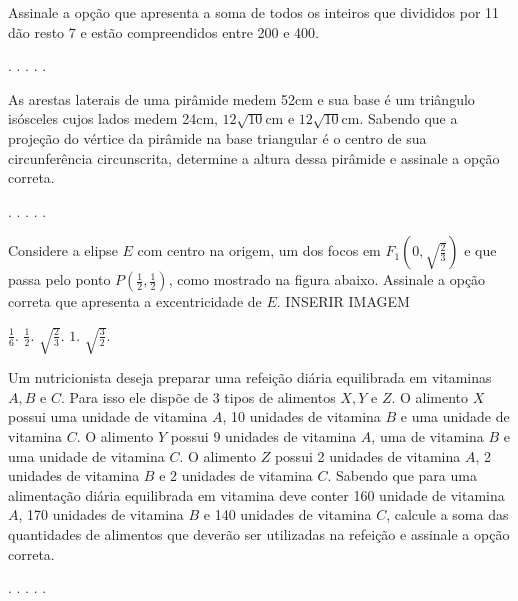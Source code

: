 \begin{question}%
Assinale a opção que apresenta a soma de todos os inteiros que divididos por 11 dão resto 7 e estão compreendidos entre 200 e 400.
    \begin{tasks}
        .
        .
        .
        .
        .
    \end{tasks}
\end{question}

\begin{question}%
As arestas laterais de uma pirâmide medem 52cm e sua base é um triângulo isósceles cujos lados medem 24cm, \(12\sqrt{10}\)cm e \(12\sqrt{10}\)cm. Sabendo que a projeção do vértice da pirâmide na base triangular é o centro de sua circunferência circunscrita, determine a altura dessa pirâmide e assinale a opção correta.
    \begin{tasks}
        \task 12cm.
        \task 16cm.
        \task 30cm.
        \task 36cm.
        \task 48cm.
    \end{tasks}
\end{question}

\begin{question}%
Considere a elipse \(E\) com centro na origem, um dos focos em \(F_1 \left( 0, \sqrt{\frac{2}{3}} \right)\) e que passa pelo ponto \(P \left( \frac{1}{2}, \frac{1}{2} \right)\), como mostrado na figura abaixo. Assinale a opção correta que apresenta a excentricidade de \(E\).
INSERIR IMAGEM
    \begin{tasks}
        \task \(\frac{1}{6}\).
        \task \(\frac{1}{2}\).
        \task \(\sqrt{\frac{2}{3}}\).
        \task \(1\).
        \task \(\sqrt{\frac{3}{2}}\).
    \end{tasks}
\end{question}

\begin{question}%
Um nutricionista deseja preparar uma refeição diária equilibrada em vitaminas \(A,B\) e \(C\). Para isso ele dispõe de 3 tipos de alimentos \(X,Y\) e \(Z\). O alimento \(X\) possui uma unidade de vitamina \(A\), 10 unidades de vitamina \(B\) e uma unidade de vitamina \(C\). O alimento \(Y\) possui 9 unidades de vitamina \(A\), uma de vitamina \(B\) e uma unidade de vitamina \(C\). O alimento \(Z\) possui 2 unidades de vitamina \(A\), 2 unidades de vitamina \(B\) e 2 unidades de vitamina \(C\). Sabendo que para uma alimentação diária equilibrada em vitamina deve conter 160 unidade de vitamina \(A\), 170 unidades de vitamina \(B\) e 140 unidades de vitamina \(C\), calcule a soma das quantidades de alimentos que deverão ser utilizadas na refeição e assinale a opção correta.
    \begin{tasks}
        .
        .
        .
        .
        .
    \end{tasks}
\end{question}

